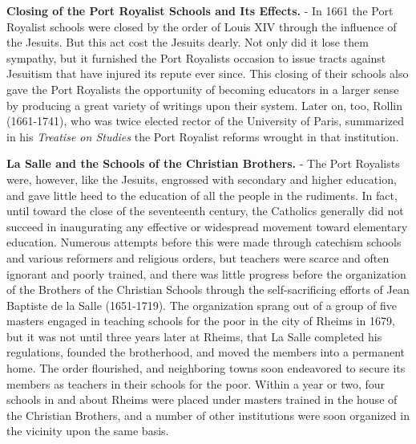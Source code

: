 \documentclass[]{book}
\begin{document}
\textbf{Closing of the Port Royalist Schools and Its Effects.} - In 1661 the Port Royalist schools were closed by the order of Louis XIV through the influence of the Jesuits. But this act cost the Jesuits dearly. Not only did it lose them sympathy, but it furnished the Port Royalists occasion to issue tracts against Jesuitism that have injured its repute ever since. This closing of their schools also gave the Port Royalists the opportunity of becoming educators in a larger sense by producing a great variety of writings upon their system. Later on, too, Rollin (1661-1741), who was twice elected rector of the University of Paris, summarized in his \emph{Treatise on Studies} the Port Royalist reforms wrought in that institution.

\textbf{La Salle and the Schools of the Christian Brothers.} - The Port Royalists were, however, like the Jesuits, engrossed with secondary and higher education, and gave little heed to the education of all the people in the rudiments. In fact, until toward the close of the seventeenth century, the Catholics generally did not succeed in inaugurating any effective or widespread movement toward elementary education. Numerous attempts before this were made through catechism schools and various reformers and religious orders, but teachers were scarce and often ignorant and poorly trained, and there was little progress before the organization of the Brothers of the Christian Schools through the self-sacrificing efforts of Jean Baptiste de la Salle (1651-1719). The organization sprang out of a group of five masters engaged in teaching schools for the poor in the city of Rheims in 1679, but it was not until three years later at Rheims, that La Salle completed his regulations, founded the brotherhood, and moved the members into a permanent home. The order flourished, and neighboring towns soon endeavored to secure its members as teachers in their schools for the poor. Within a year or two, four schools in and about Rheims were placed under masters trained in the house of the Christian Brothers, and a number of other institutions were soon organized in the vicinity upon the same basis.
\end{document}
